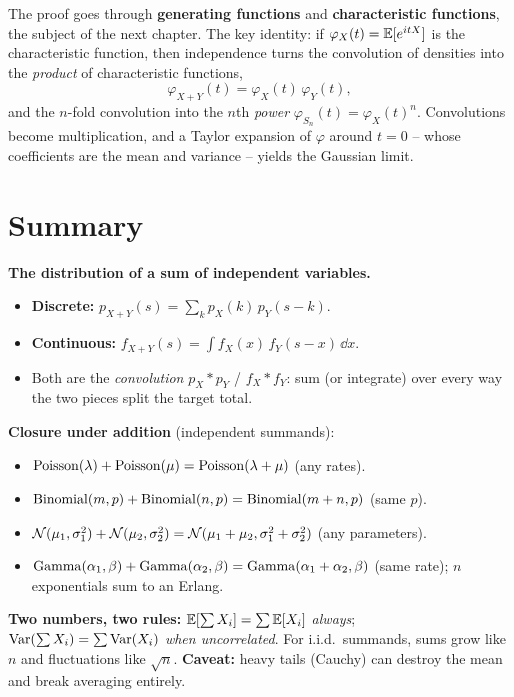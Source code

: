 \begin{connectionbox}
The proof goes through \textbf{generating functions} and
\textbf{characteristic functions}, the subject of the next chapter.
The key identity: if $\varphi_X(t)=\operatorname{\mathbb{E}}[e^{itX}]$ is the characteristic
function, then independence turns the convolution of densities into the
\emph{product} of characteristic functions,
\[
\varphi_{X+Y}(t)=\varphi_X(t)\,\varphi_Y(t),
\]
and the $n$-fold convolution into the $n$th \emph{power}
$\varphi_{S_n}(t)=\varphi_X(t)^n$. Convolutions become multiplication, and a
Taylor expansion of $\varphi$ around $t=0$ -- whose coefficients are the mean
and variance -- yields the Gaussian limit.
\end{connectionbox}

\section{Summary}
\label{ch17:summary}

\begin{formalbox}
\textbf{The distribution of a sum of independent variables.}
\begin{itemize}
  \item \textbf{Discrete:} $p_{X+Y}(s)=\sum_k p_X(k)\,p_Y(s-k)$.
  \item \textbf{Continuous:} $f_{X+Y}(s)=\int f_X(x)\,f_Y(s-x)\,\dd x$.
  \item Both are the \emph{convolution} $p_X*p_Y$ / $f_X*f_Y$: sum (or
        integrate) over every way the two pieces split the target total.
\end{itemize}
\textbf{Closure under addition} (independent summands):
\begin{itemize}
  \item $\operatorname{Poisson}(\lambda)+\operatorname{Poisson}(\mu)=\operatorname{Poisson}(\lambda+\mu)$ (any rates).
  \item $\operatorname{Binomial}(m,p)+\operatorname{Binomial}(n,p)=\operatorname{Binomial}(m+n,p)$ (same $p$).
  \item $\mathcal{N}(\mu_1,\sigma_1^2)+\mathcal{N}(\mu_2,\sigma_2^2)
        =\mathcal{N}(\mu_1+\mu_2,\sigma_1^2+\sigma_2^2)$ (any parameters).
  \item $\operatorname{Gamma}(\alpha_1,\beta)+\operatorname{Gamma}(\alpha_2,\beta)=\operatorname{Gamma}(\alpha_1+\alpha_2,\beta)$
        (same rate); $n$ exponentials sum to an Erlang.
\end{itemize}
\textbf{Two numbers, two rules:} $\operatorname{\mathbb{E}}[\sum X_i]=\sum\operatorname{\mathbb{E}}[X_i]$ \emph{always};
$\operatorname{Var}(\sum X_i)=\sum\operatorname{Var}(X_i)$ \emph{when uncorrelated}. For i.i.d.\
summands, sums grow like $n$ and fluctuations like $\sqrt n$.
\textbf{Caveat:} heavy tails (Cauchy) can destroy the mean and break
averaging entirely.
\end{formalbox}

